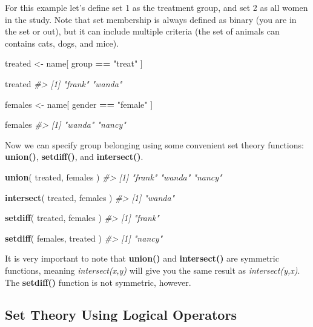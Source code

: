 \documentclass[]{book}
\newenvironment{Shaded}{\begin{snugshade}}{\end{snugshade}}
\newcommand{\CommentTok}[1]{\textcolor[rgb]{0.56,0.35,0.01}{\textit{#1}}}
\newcommand{\KeywordTok}[1]{\textcolor[rgb]{0.13,0.29,0.53}{\textbf{#1}}}
\newcommand{\NormalTok}[1]{#1}
\newcommand{\OperatorTok}[1]{\textcolor[rgb]{0.81,0.36,0.00}{\textbf{#1}}}
\newcommand{\StringTok}[1]{\textcolor[rgb]{0.31,0.60,0.02}{#1}}
\theoremstyle{definition}
\theoremstyle{definition}
\theoremstyle{definition}
\theoremstyle{remark}
\begin{document}
For this example let's define set 1 as the treatment group, and set 2 as
all women in the study. Note that set membership is always defined as
binary (you are in the set or out), but it can include multiple criteria
(the set of animals can contains cats, dogs, and mice).

\begin{Shaded}
\begin{Highlighting}[]

\NormalTok{treated <-}\StringTok{ }\NormalTok{name[ group }\OperatorTok{==}\StringTok{ "treat"}\NormalTok{ ]}

\NormalTok{treated }
\CommentTok{#> [1] "frank" "wanda"}

\NormalTok{females <-}\StringTok{ }\NormalTok{name[ gender }\OperatorTok{==}\StringTok{ "female"}\NormalTok{ ]}

\NormalTok{females }
\CommentTok{#> [1] "wanda" "nancy"}
\end{Highlighting}
\end{Shaded}

Now we can specify group belonging using some convenient set theory
functions: \textbf{union()}, \textbf{setdiff()}, and
\textbf{intersect()}.

\begin{Shaded}
\begin{Highlighting}[]


\KeywordTok{union}\NormalTok{( treated, females )}
\CommentTok{#> [1] "frank" "wanda" "nancy"}

\KeywordTok{intersect}\NormalTok{( treated, females )}
\CommentTok{#> [1] "wanda"}

\KeywordTok{setdiff}\NormalTok{( treated, females )}
\CommentTok{#> [1] "frank"}

\KeywordTok{setdiff}\NormalTok{( females, treated )}
\CommentTok{#> [1] "nancy"}
\end{Highlighting}
\end{Shaded}

It is very important to note that \textbf{union()} and
\textbf{intersect()} are symmetric functions, meaning
\emph{intersect(x,y)} will give you the same result as
\emph{intersect(y,x)}. The \textbf{setdiff()} function is not symmetric,
however.

\hypertarget{set-theory-using-logical-operators}{%
\subsection{Set Theory Using Logical
Operators}\label{set-theory-using-logical-operators}}
\end{document}
